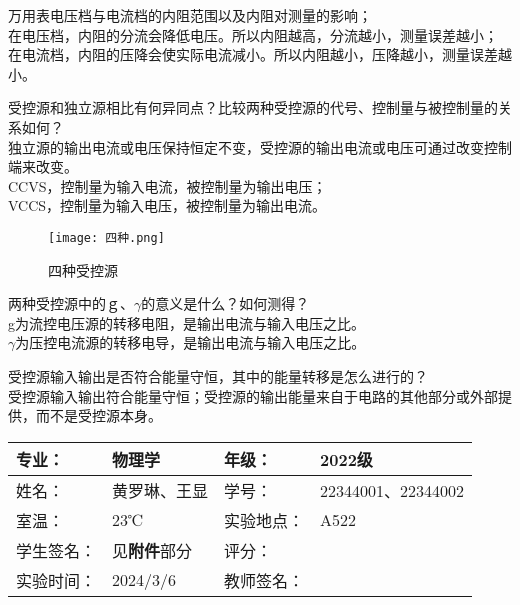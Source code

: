 \documentclass[dvipsnames, svgnames,a4paper,11pt]{article}
\begin{document}
	\begin{question}
		万用表电压档与电流档的内阻范围以及内阻对测量的影响；\\
		在电压档，内阻的分流会降低电压。所以内阻越高，分流越小，测量误差越小；\\
		在电流档，内阻的压降会使实际电流减小。所以内阻越小，压降越小，测量误差越小。
	\end{question}
	\begin{question}
		受控源和独立源相比有何异同点？比较两种受控源的代号、控制量与被控制量的关系如何？\\
		独立源的输出电流或电压保持恒定不变，受控源的输出电流或电压可通过改变控制端来改变。\\
		CCVS，控制量为输入电流，被控制量为输出电压；\\
		 VCCS，控制量为输入电压，被控制量为输出电流。
		 \end{question}
		 \begin{figure}[htbp]
		 	\centering
		 	\texttt{[image: 四种.png]}
		 	\caption{四种受控源}
		 \end{figure}
	
	\begin{question}
		两种受控源中的ｇ、$\gamma$的意义是什么？如何测得？\\
		g为流控电压源的转移电阻，是输出电流与输入电压之比。\\
		$\gamma$为压控电流源的转移电导，是输出电流与输入电压之比。
	\end{question}
	\begin{question}
		受控源输入输出是否符合能量守恒，其中的能量转移是怎么进行的？\\
		受控源输入输出符合能量守恒；受控源的输出能量来自于电路的其他部分或外部提供，而不是受控源本身。
	\end{question}
	\clearpage
	
	\begin{table}
		\renewcommand\arraystretch{1.7}
		\centering
		\begin{tabularx}{\textwidth}{|X|X|X|X|}
			\hline
			专业： & 物理学 & 年级： & 2022级 \\
			\hline
			姓名： & 黄罗琳、王显 & 学号： & 22344001、22344002\\
			\hline
			室温： &  23℃& 实验地点： & A522 \\
			\hline
			学生签名：& 见\textbf{附件}部分 & 评分： &\\
			\hline
			实验时间：& 2024/3/6 & 教师签名：&\\
			\hline
		\end{tabularx}
	\end{table}
	
\end{document}
